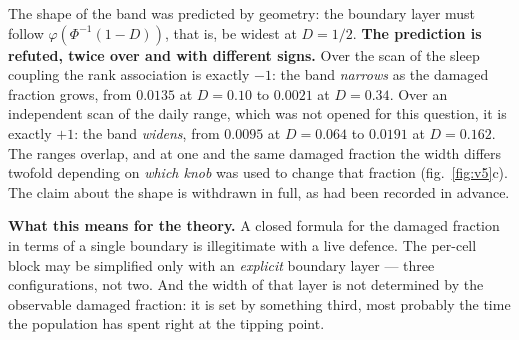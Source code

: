 \begin{ineq}
The shape of the band was predicted by geometry: the boundary layer must follow $\varphi(\Phi^{-1}(1-D))$, that is, be widest at $D=1/2$. \textbf{The prediction is refuted, twice over and with different signs.} Over the scan of the sleep coupling the rank association is exactly $-1$: the band \emph{narrows} as the damaged fraction grows, from $0.0135$ at $D=0.10$ to $0.0021$ at $D=0.34$. Over an independent scan of the daily range, which was not opened for this question, it is exactly $+1$: the band \emph{widens}, from $0.0095$ at $D=0.064$ to $0.0191$ at $D=0.162$. The ranges overlap, and at one and the same damaged fraction the width differs twofold depending on \emph{which knob} was used to change that fraction (fig.~\ref{fig:v5}c). The claim about the shape is withdrawn in full, as had been recorded in advance.
\end{ineq}

\textbf{What this means for the theory.} A closed formula for the damaged fraction in terms of a single boundary is illegitimate with a live defence. The per-cell block may be simplified only with an \emph{explicit} boundary layer --- three configurations, not two. And the width of that layer is not determined by the observable damaged fraction: it is set by something third, most probably the time the population has spent right at the tipping point.
